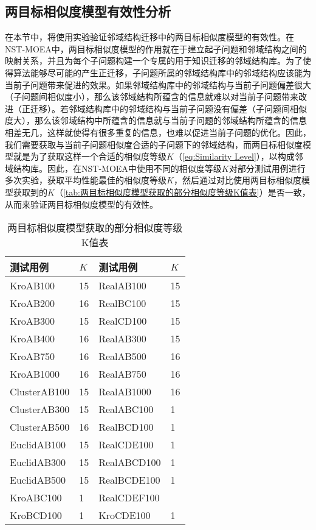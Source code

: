 \subsection{两目标相似度模型有效性分析}
\label{subsec:NST:实验与讨论:两目标相似度模型有效性分析}
在本节中，将使用实验验证邻域结构迁移中的两目标相似度模型的有效性。在NST-MOEA中，两目标相似度模型的作用就在于建立起子问题和邻域结构之间的映射关系，并且为每个子问题构建一个专属的用于知识迁移的邻域结构库。为了使得算法能够尽可能的产生正迁移，子问题所属的邻域结构库中的邻域结构应该能为当前子问题带来促进的效果。如果邻域结构库中的邻域结构与当前子问题偏差很大（子问题间相似度小），那么该邻域结构所蕴含的信息就难以对当前子问题带来改进（正迁移）。若邻域结构库中的邻域结构与当前子问题没有偏差（子问题间相似度大），那么该邻域结构中所蕴含的信息就与当前子问题的邻域结构所蕴含的信息相差无几，这样就使得有很多重复的信息，也难以促进当前子问题的优化。因此，我们需要获取与当前子问题相似度合适的子问题下的邻域结构，而两目标相似度模型就是为了获取这样一个合适的相似度等级$K$（\autoref{eq:Similarity Level}），以构成邻域结构库。因此，在NST-MOEA中使用不同的相似度等级$K$对部分测试用例进行多次实验，获取平均性能最佳的相似度等级$K$，然后通过对比使用两目标相似度模型获取到的$K$（\autoref{tab:两目标相似度模型获取的部分相似度等级K值表}）是否一致，从而来验证两目标相似度模型的有效性。
\begin{table}[h]
    \centering
    \caption{两目标相似度模型获取的部分相似度等级K值表 \label{tab:两目标相似度模型获取的部分相似度等级K值表}}
    \begin{tabular}{ll|ll}
        \toprule
        测试用例   & $K$  & 测试用例    & $K$ \\
        \midrule
        KroAB100      & 15    & RealAB100     & 15  \\
        KroAB200      & 16    & RealBC100     & 15  \\
        KroAB300      & 15    & RealCD100     & 15  \\
        KroAB400      & 16    & RealAB300     & 15  \\
        KroAB750      & 16    & RealAB500     & 16  \\
        KroAB1000     & 16    & RealAB750     & 16  \\
        ClusterAB100  & 15    & RealAB1000    & 16  \\
        ClusterAB300  & 15    & RealABC100    & 1   \\
        ClusterAB500  & 16    & RealBCD100    & 1   \\
        EuclidAB100   & 15    & RealCDE100    & 1   \\
        EuclidAB300   & 15    & RealABCD100   & 1   \\
        EuclidAB500   & 15    & RealBCDE100   & 1   \\
        KroABC100     & 1     & RealCDEF100   &     \\
        KroBCD100     & 1     & KroCDE100     & 1   \\
        \bottomrule
    \end{tabular}
\end{table}
